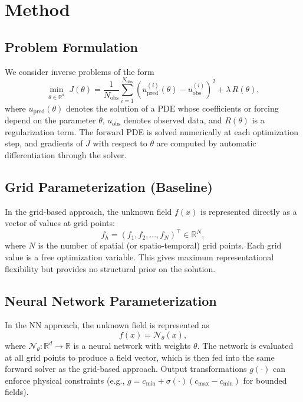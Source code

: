 \documentclass[11pt]{article}
\newcommand{\R}{\mathbb{R}}
\begin{document}
\section{Method}
\label{sec:method}

\subsection{Problem Formulation}

We consider inverse problems of the form
\begin{equation}
  \min_{\theta \in \R^d} \; J(\theta) = \frac{1}{N_{\text{obs}}} \sum_{i=1}^{N_{\text{obs}}} \left( u_{\text{pred}}^{(i)}(\theta) - u_{\text{obs}}^{(i)} \right)^2 + \lambda \, R(\theta),
  \label{eq:objective}
\end{equation}
where $u_{\text{pred}}(\theta)$ denotes the solution of a PDE whose coefficients or forcing depend on the parameter $\theta$, $u_{\text{obs}}$ denotes observed data, and $R(\theta)$ is a regularization term. The forward PDE is solved numerically at each optimization step, and gradients of $J$ with respect to $\theta$ are computed by automatic differentiation through the solver.

\subsection{Grid Parameterization (Baseline)}

In the grid-based approach, the unknown field $f(x)$ is represented directly as a vector of values at grid points:
\begin{equation}
  f_h = (f_1, f_2, \ldots, f_N)^\top \in \R^N,
\end{equation}
where $N$ is the number of spatial (or spatio-temporal) grid points. Each grid value is a free optimization variable. This gives maximum representational flexibility but provides no structural prior on the solution.

\subsection{Neural Network Parameterization}

In the NN approach, the unknown field is represented as
\begin{equation}
  f(x) = \mathcal{N}_\theta(x),
\end{equation}
where $\mathcal{N}_\theta : \R^d \to \R$ is a neural network with weights $\theta$. The network is evaluated at all grid points to produce a field vector, which is then fed into the same forward solver as the grid-based approach. Output transformations $g(\cdot)$ can enforce physical constraints (e.g., $g = c_{\min} + \sigma(\cdot)(c_{\max} - c_{\min})$ for bounded fields).
\end{document}
